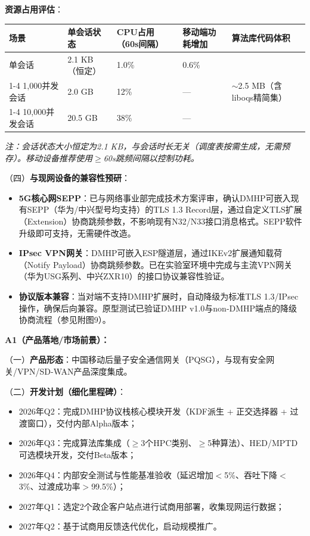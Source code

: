 ﻿\documentclass[12pt,a4paper]{article}
\begin{document}
{{\textbf{资源占用评估}：

\begin{center}

\begin{tabular}{|p{3.0cm}|p{2.5cm}|p{2.5cm}|p{2.5cm}|p{2.5cm}|}
\hline
\textbf{场景} & \textbf{单会话状态} & \textbf{CPU占用（60s间隔）} & \textbf{移动端功耗增加} & \textbf{算法库代码体积} \\
\hline
单会话 & 2.1 KB（恒定） & 1.0\% & 0.6\% & \multirow{3}{*}{$\sim$2.5 MB（含liboqs精简集）} \\
\cline{1-4}
1,000并发会话 & 2.0 GB & 12\% & --- & \\
\cline{1-4}
10,000并发会话 & 20.5 GB & 38\% & --- & \\
\hline
\end{tabular}
\end{center}
\textit{注：会话状态大小恒定为2.1 KB，与会话时长无关（调度表按需生成，无需预存）。移动设备推荐使用$\geq$60s跳频间隔以控制功耗。}

（四）\textbf{与现网设备的兼容性预研}：
\begin{itemize}[noitemsep]
    \item \textbf{5G核心网SEPP}：已与网络事业部完成技术方案评审，确认DMHP可嵌入现有SEPP（华为/中兴型号均支持）的TLS 1.3 Record层，通过自定义TLS扩展（Extension）协商跳频参数，不影响现有N32/N33接口消息格式。SEPP软件升级即可支持，无需硬件改造。
    \item \textbf{IPsec VPN网关}：DMHP可嵌入ESP隧道层，通过IKEv2扩展通知载荷（Notify Payload）协商跳频参数。已在实验室环境中完成与主流VPN网关（华为USG系列、中兴ZXR10）的接口协议兼容性验证。
    \item \textbf{协议版本兼容}：当对端不支持DMHP扩展时，自动降级为标准TLS 1.3/IPsec操作，确保后向兼容。原型测试已验证DMHP v1.0与non-DMHP端点的降级协商流程（参见附图9）。
\end{itemize}

\textbf{A1（产品落地/市场前景）：}

（一）\textbf{产品形态}：中国移动后量子安全通信网关（PQSG），与现有安全网关/VPN/SD-WAN产品深度集成。

（二）\textbf{开发计划（细化里程碑）}：
\begin{itemize}[noitemsep]
    \item 2026年Q2：完成DMHP协议栈核心模块开发（KDF派生 + 正交选择器 + 过渡窗口），交付内部Alpha版本；
    \item 2026年Q3：完成算法库集成（$\geq$3个HPC类别、$\geq$5种算法）、HED/MPTD可选模块开发，交付Beta版本；
    \item 2026年Q4：内部安全测试与性能基准验收（延迟增加$<$5\%、吞吐下降$<$3\%、过渡成功率$>$99.5\%）；
    \item 2027年Q1：选定2个政企客户站点进行试商用部署，收集现网运行数据；
    \item 2027年Q2：基于试商用反馈迭代优化，启动规模推广。
\end{itemize}

}}
\end{document}
